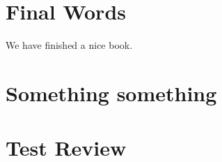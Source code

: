 \documentclass[
]{book}
\begin{document}
\hypertarget{final-words}{%
\chapter{Final Words}\label{final-words}}

We have finished a nice book.

\hypertarget{something-something}{%
\chapter{Something something}\label{something-something}}

\hypertarget{test-review}{%
\chapter{Test Review}\label{test-review}}

  
\end{document}
